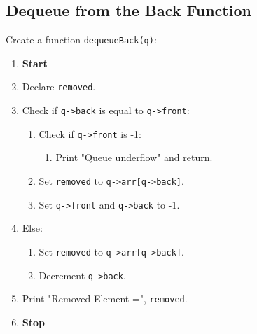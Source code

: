 {  \subsection{Dequeue from the Back Function}
  Create a function \texttt{dequeueBack(q)}:
  \begin{enumerate}[label=\arabic*:,left=0pt]
    \item \textbf{Start}
    \item Declare \texttt{removed}.
    \item Check if \texttt{q->back} is equal to \texttt{q->front}:
          \begin{enumerate}[label=2.\arabic*.]
            \item Check if \texttt{q->front} is -1:
                  \begin{enumerate}[label=3.\arabic*.]
                    \item Print "Queue underflow" and return.
                  \end{enumerate}
            \item Set \texttt{removed} to \texttt{q->arr[q->back]}.
            \item Set \texttt{q->front} and \texttt{q->back} to -1.
          \end{enumerate}
    \item Else:
          \begin{enumerate}[label=2.\arabic*.]
            \item Set \texttt{removed} to \texttt{q->arr[q->back]}.
            \item Decrement \texttt{q->back}.
          \end{enumerate}
    \item Print "Removed Element =", \texttt{removed}.
    \item \textbf{Stop}
  \end{enumerate}

}
